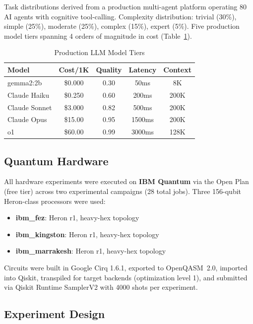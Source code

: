 \documentclass[conference]{IEEEtran}
\begin{document}
Task distributions derived from a production multi-agent platform operating 80 AI agents with cognitive tool-calling. Complexity distribution: trivial (30\%), simple (25\%), moderate (25\%), complex (15\%), expert (5\%). Five production model tiers spanning 4 orders of magnitude in cost (Table~\ref{tab:models}).

\begin{table}[h]
\centering
\caption{Production LLM Model Tiers}
\label{tab:models}
\begin{tabular}{lcccc}
\toprule
\textbf{Model} & \textbf{Cost/1K} & \textbf{Quality} & \textbf{Latency} & \textbf{Context} \\
\midrule
gemma2:2b & \$0.000 & 0.30 & 50ms & 8K \\
Claude Haiku & \$0.250 & 0.60 & 200ms & 200K \\
Claude Sonnet & \$3.000 & 0.82 & 500ms & 200K \\
Claude Opus & \$15.00 & 0.95 & 1500ms & 200K \\
o1 & \$60.00 & 0.99 & 3000ms & 128K \\
\bottomrule
\end{tabular}
\end{table}

\subsection{Quantum Hardware}

All hardware experiments were executed on \textbf{IBM Quantum} via the Open Plan (free tier) across two experimental campaigns (28 total jobs). Three 156-qubit Heron-class processors were used:

\begin{itemize}
    \item \textbf{ibm\_fez}: Heron r1, heavy-hex topology
    \item \textbf{ibm\_kingston}: Heron r1, heavy-hex topology
    \item \textbf{ibm\_marrakesh}: Heron r1, heavy-hex topology
\end{itemize}

Circuits were built in Google Cirq 1.6.1, exported to OpenQASM~2.0, imported into Qiskit, transpiled for target backends (optimization level 1), and submitted via Qiskit Runtime SamplerV2 with 4000 shots per experiment.

\subsection{Experiment Design}
\end{document}
